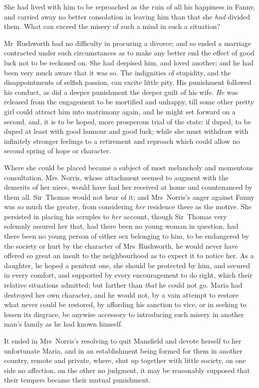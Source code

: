 She had lived with him to be reproached as the ruin of all his happiness in Fanny, and carried away no better consolation in leaving him than that she \textit{had}  divided them. What can exceed the misery of such a mind in such a situation?

Mr~Rushworth had no difficulty in procuring a divorce; and so ended a marriage contracted under such circumstances as to make any better end the effect of good luck not to be reckoned on. She had despised him, and loved another; and he had been very much aware that it was so. The indignities of stupidity, and the disappointments of selfish passion, can excite little pity. His punishment followed his conduct, as did a deeper punishment the deeper guilt of his wife. \textit{He}  was released from the engagement to be mortified and unhappy, till some other pretty girl could attract him into matrimony again, and he might set forward on a second, and, it is to be hoped, more prosperous trial of the state: if duped, to be duped at least with good humour and good luck; while she must withdraw with infinitely stronger feelings to a retirement and reproach which could allow no second spring of hope or character.

Where she could be placed became a subject of most melancholy and momentous consultation. Mrs~Norris, whose attachment seemed to augment with the demerits of her niece, would have had her received at home and countenanced by them all. Sir~Thomas would not hear of it; and Mrs~Norris's anger against Fanny was so much the greater, from considering \textit{her}  residence there as the motive. She persisted in placing his scruples to \textit{her}  account, though Sir~Thomas very solemnly assured her that, had there been no young woman in question, had there been no young person of either sex belonging to him, to be endangered by the society or hurt by the character of Mrs~Rushworth, he would never have offered so great an insult to the neighbourhood as to expect it to notice her. As a daughter, he hoped a penitent one, she should be protected by him, and secured in every comfort, and supported by every encouragement to do right, which their relative situations admitted; but farther than \textit{that}  he could not go. Maria had destroyed her own character, and he would not, by a vain attempt to restore what never could be restored, by affording his sanction to vice, or in seeking to lessen its disgrace, be anywise accessory to introducing such misery in another man's family as he had known himself.

It ended in Mrs~Norris's resolving to quit Mansfield and devote herself to her unfortunate Maria, and in an establishment being formed for them in another country, remote and private, where, shut up together with little society, on one side no affection, on the other no judgment, it may be reasonably supposed that their tempers became their mutual punishment.

